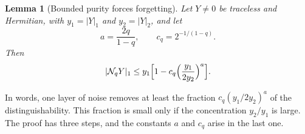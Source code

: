 \documentclass[aps,pra,reprint,superscriptaddress,floatfix]{revtex4-2}
\theoremstyle{plain}
\newtheorem{lemma}{Lemma}
\newcommand{\nrm}[2]{\lvert #1\rvert_{#2}}
\newcommand{\Nq}{\mathcal N_q}
\begin{document}
\begin{lemma}[Bounded purity forces forgetting]\label{lem:forget}
Let $Y\ne0$ be traceless and Hermitian, with $y_1=\nrm Y1$ and $y_2=\nrm Y2$, and let
\begin{equation}
a=\frac{2q}{1-q},\qquad c_q=2^{-1/(1-q)} .
\label{eq:A-acq}
\end{equation}
Then
\begin{equation}
\nrm{\Nq Y}1\le y_1\Bigl[1-c_q\Bigl(\frac{y_1}{2y_2}\Bigr)^{a}\Bigr].
\label{eq:A-forget}
\end{equation}
\end{lemma}

In words, one layer of noise removes at least the fraction $c_q(y_1/2y_2)^a$ of the distinguishability. This fraction is small only if the concentration $y_2/y_1$ is large. The proof has three steps, and the constants $a$ and $c_q$ arise in the last one.
\end{document}
